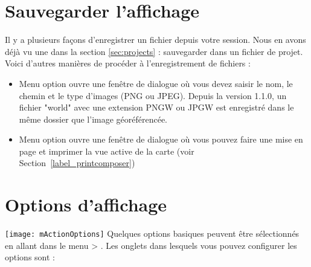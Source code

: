 \section{Sauvegarder l'affichage}\label{sec:output}
Il y a plusieurs façons d'enregistrer un fichier depuis votre session. Nous en avons déjà vu une dans la section \ref{sec:projects} : sauvegarder dans un fichier de projet.
Voici d'autres manières de procéder à l'enregistrement de fichiers :
\begin{itemize}[label=--]
\item Menu option  ouvre une fenêtre de dialogue où vous devez saisir le nom, le chemin et le type d'images (PNG ou JPEG). Depuis la version 1.1.0, un fichier "world" avec une extension PNGW ou JPGW est enregistré dans le même dossier que l'image géoréférencée.
\item Menu option  ouvre une fenêtre de dialogue où vous pouvez faire une mise en page et imprimer la vue active de la carte (voir Section~\ref{label_printcomposer})
\end{itemize}

\section{Options d'affichage}\label{subsec:gui_options}
\texttt{[image: mActionOptions]} 
Quelques options basiques peuvent être sélectionnés en allant dans le menu  >
. Les onglets dans lesquels vous pouvez configurer les options sont :


